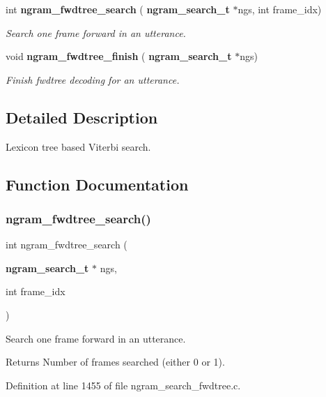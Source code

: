 \begin{DoxyCompactItemize}
int \textbf{ ngram\+\_\+fwdtree\+\_\+search} (\textbf{ ngram\+\_\+search\+\_\+t} $\ast$ngs, int frame\+\_\+idx)
\begin{DoxyCompactList}\small\item\em Search one frame forward in an utterance. \end{DoxyCompactList}\item 
\mbox{\label{ngram__search__fwdtree_8h_af32a83dbb9187542577a0c500b000840}} 
void \textbf{ ngram\+\_\+fwdtree\+\_\+finish} (\textbf{ ngram\+\_\+search\+\_\+t} $\ast$ngs)
\begin{DoxyCompactList}\small\item\em Finish fwdtree decoding for an utterance. \end{DoxyCompactList}\end{DoxyCompactItemize}


\subsection{Detailed Description}
Lexicon tree based Viterbi search. 



\subsection{Function Documentation}
\mbox{\label{ngram__search__fwdtree_8h_a9e2828ba0d249424a234b6cf7d3ee530}} 
\subsubsection{ngram\+\_\+fwdtree\+\_\+search()}
{\footnotesize\ttfamily int ngram\+\_\+fwdtree\+\_\+search (\begin{DoxyParamCaption}\item[{\textbf{ ngram\+\_\+search\+\_\+t} $\ast$}]{ngs,  }\item[{int}]{frame\+\_\+idx }\end{DoxyParamCaption})}



Search one frame forward in an utterance. 

\begin{DoxyReturn}{Returns}
Number of frames searched (either 0 or 1). 
\end{DoxyReturn}


Definition at line 1455 of file ngram\+\_\+search\+\_\+fwdtree.\+c.

